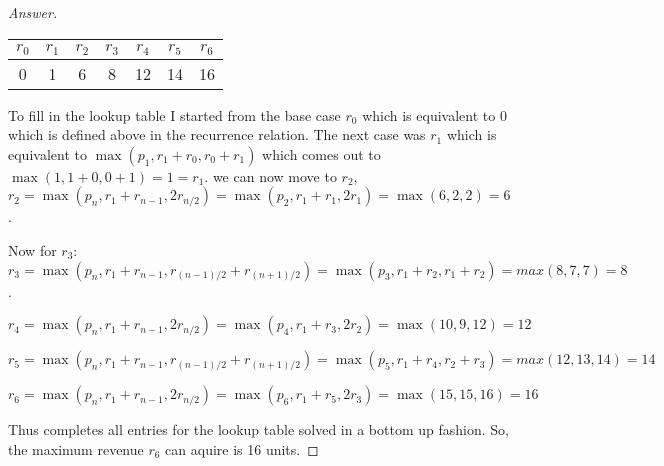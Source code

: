 \documentclass[11pt]{article}
\theoremstyle{definition}
\theoremstyle{definition}
\theoremstyle{definition}
\begin{document}
\begin{proof}[Answer]
\begin{center}
	\begin{tabular}{|c|c|c|c|c|c|c|}
	\hline
	$r_0$ & $r_{1}$ & $r_{2}$ & $r_{3}$ & $r_{4}$ & $r_{5}$ & $r_{6}$ \\ \hline
        0&1 & 6& 8&12 &14 &16 \\ \hline
	\end{tabular}
\end{center}

To fill in the lookup table I started from the base case $r_0$ which is equivalent to 0 which is defined above in the recurrence relation. The next case was $r_1$ which is equivalent to $\max(p_1, r_1 + r_{0}, r_{0} + r_{1})$ which comes out to $\max(1, 1 + 0, 0 + 1) = 1 = r_1$. we can now move to $r_2$, $r_2 = \max(p_n, r_1 + r_{n-1}, 2r_{n/2}) = \max(p_2, r_1 + r_{1}, 2r_{1}) = \max(6, 2, 2) = 6$.

Now for $r_3$: $r_3 =  \max(p_n, r_1 + r_{n-1}, r_{(n-1)/2} + r_{(n+1)/2}) =  \max(p_3, r_1 + r_{2}, r_{1} + r_{2}) = max(8, 7, 7) = 8$.

$r_4 = \max(p_n, r_1 + r_{n-1}, 2r_{n/2}) = \max(p_4, r_1 + r_{3}, 2r_{2}) = \max(10, 9, 12) = 12$

$ r_5 =  \max(p_n, r_1 + r_{n-1}, r_{(n-1)/2} + r_{(n+1)/2}) =  \max(p_5, r_1 + r_{4}, r_{2} + r_{3}) = max(12, 13, 14) = 14$

$r_6 = \max(p_n, r_1 + r_{n-1}, 2r_{n/2}) = \max(p_6, r_1 + r_{5}, 2r_{3}) = \max(15, 15, 16) = 16$

Thus completes all entries for the lookup table solved in a bottom up fashion. So, the maximum revenue $r_6$ can aquire is 16 units.

\end{proof}

\end{document}
